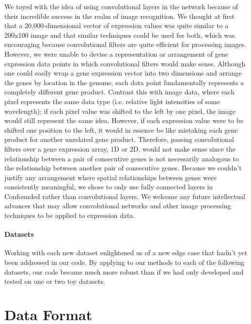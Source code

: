 \documentclass{article}
\begin{document}
We toyed with the idea of using convolutional layers \cite{krizhevsky_imagenet_2012-1} in the network because of their incredible success in the realm of image recognition.
We thought at first that a 20,000-dimensional vector of expression values was quite similar to a 200x100 image and that similar techniques could be used for both, which was encouraging because convolutional filters are quite efficient for processing images.
However, we were unable to devise a representation or arrangement of gene expression data points in which convolutional filters would make sense.
Although one could easily wrap a gene expression vector into two dimensions and arrange the genes by location in the genome, each data point fundamentally represents a completely different gene product.
Contrast this with image data, where each pixel represents the same data type (i.e. relative light intensities of some wavelength); if each pixel value was shifted to the left by one pixel, the image would still represent the same idea.
However, if each expression value were to be shifted one position to the left, it would in essence be like mistaking each gene product for another unrelated gene product.
Therefore, passing convolutional filters over a gene expression array, 1D or 2D, would not make sense since the relationship between a pair of consecutive genes is not necessarily analogous to the relationship between another pair of consecutive genes.
Because we couldn't justify any arrangement where spatial relationships between genes were consistently meaningful, we chose to only use fully connected layers in Confounded rather than convolutional layers.
We welcome any future intellectual advances that may allow convolutional networks and other image processing techniques to be applied to expression data.

\paragraph{Datasets}

Working with each new dataset enlightened us of a new edge case that hadn't yet been addressed in our code.
By applying to our methods to each of the following datasets, our code became much more robust than if we had only developed and tested on one or two toy datasets.


\section{Data Format}
\end{document}
